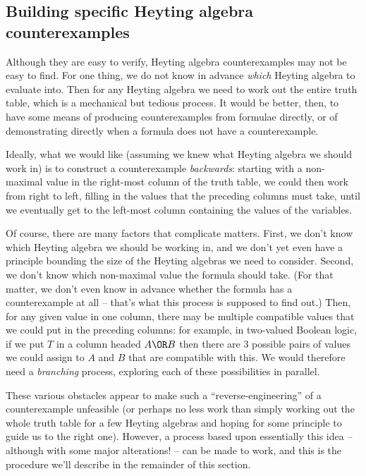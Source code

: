 \subsection{Building specific Heyting algebra counterexamples}

Although they are easy to verify, Heyting algebra counterexamples may not be easy to find.  For one thing, we do not know in advance \emph{which} Heyting algebra to evaluate into.  Then for any Heyting algebra we need to work out the entire truth table, which is a mechanical but tedious process.  It would be better, then, to have some means of producing counterexamples from formulae directly, or of demonstrating directly when a formula does not have a counterexample.

Ideally, what we would like (assuming we knew what Heyting algebra we should work in) is to construct a counterexample \emph{backwards}: starting with a non-maximal value in the right-most column of the truth table, we could then work from right to left, filling in the values that the preceding columns must take, until we eventually get to the left-most column containing the values of the variables.  


Of course, there are many factors that complicate matters.  First, we don't know which Heyting algebra we should be working in, and we don't yet even have a principle bounding the size of the Heyting algebras we need to consider.  Second, we don't know which non-maximal value the formula should take.  (For that matter, we don't even know in advance whether the formula has a counterexample at all -- that's what this process is supposed to find out.)  Then, for any given value in one column, there may be multiple compatible values that we could put in the preceding columns: for example, in two-valued Boolean logic, if we put $T$ in a column headed $A \OR B$ then there are 3 possible pairs of values we could assign to $A$ and $B$ that are compatible with this.  We would therefore need a \emph{branching} process, exploring each of these possibilities in parallel.

These various obstacles appear to make such a ``reverse-engineering'' of a counterexample unfeasible (or perhaps no less work than simply working out the whole truth table for a few Heyting algebras and hoping for some principle to guide us to the right one).  
However, a process based upon essentially this idea
 -- although with some major alterations! -- can be made to work, and this is the procedure we'll describe in the remainder of this section.


